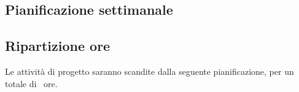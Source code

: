 
\subsection{Pianificazione settimanale}
	\prospettoSettimanale
	\newpage
	
\subsection{Ripartizione ore}
	Le attività di progetto saranno scandite dalla seguente pianificazione, per un totale di \totaleOre\ ore.
	\begin{center}
	    
	\end{center}
